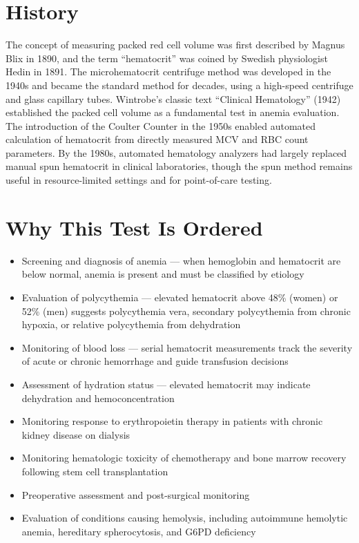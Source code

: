 \section*{History}
The concept of measuring packed red cell volume was first described by Magnus Blix in 1890, and the term ``hematocrit'' was coined by Swedish physiologist Hedin in 1891. The microhematocrit centrifuge method was developed in the 1940s and became the standard method for decades, using a high-speed centrifuge and glass capillary tubes. Wintrobe's classic text ``Clinical Hematology'' (1942) established the packed cell volume as a fundamental test in anemia evaluation. The introduction of the Coulter Counter in the 1950s enabled automated calculation of hematocrit from directly measured MCV and RBC count parameters. By the 1980s, automated hematology analyzers had largely replaced manual spun hematocrit in clinical laboratories, though the spun method remains useful in resource-limited settings and for point-of-care testing.

\section*{Why This Test Is Ordered}
\begin{itemize}
  \item Screening and diagnosis of anemia --- when hemoglobin and hematocrit are below normal, anemia is present and must be classified by etiology
  \item Evaluation of polycythemia --- elevated hematocrit above 48\% (women) or 52\% (men) suggests polycythemia vera, secondary polycythemia from chronic hypoxia, or relative polycythemia from dehydration
  \item Monitoring of blood loss --- serial hematocrit measurements track the severity of acute or chronic hemorrhage and guide transfusion decisions
  \item Assessment of hydration status --- elevated hematocrit may indicate dehydration and hemoconcentration
  \item Monitoring response to erythropoietin therapy in patients with chronic kidney disease on dialysis
  \item Monitoring hematologic toxicity of chemotherapy and bone marrow recovery following stem cell transplantation
  \item Preoperative assessment and post-surgical monitoring
  \item Evaluation of conditions causing hemolysis, including autoimmune hemolytic anemia, hereditary spherocytosis, and G6PD deficiency
\end{itemize}

